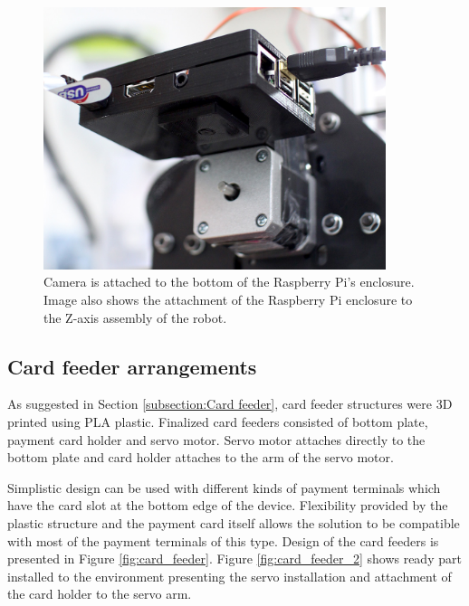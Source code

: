 \begin{figure}[ht]
  \begin{center}
    \includegraphics[width=10cm]{images/camera.jpg}
    \caption{Camera is attached to the bottom of the Raspberry Pi's enclosure. Image also shows the attachment of the Raspberry Pi enclosure to the Z-axis assembly of the robot.}
    \label{fig:camera}
  \end{center}
\end{figure}
\FloatBarrier


\subsection{Card feeder arrangements}
\label{subsection:Card feeder arrangements}

As suggested in Section \ref{subsection:Card feeder}, card feeder structures were 3D printed using PLA plastic. Finalized card feeders consisted of bottom plate, payment card holder and servo motor. Servo motor attaches directly to the bottom plate and card holder attaches to the arm of the servo motor.

Simplistic design can be used with different kinds of payment terminals which have the card slot at the bottom edge of the device. Flexibility provided by the plastic structure and the payment card itself allows the solution to be compatible with most of the payment terminals of this type. Design of the card feeders is presented in Figure \ref{fig:card_feeder}. Figure \ref{fig:card_feeder_2} shows ready part installed to the environment presenting the servo installation and attachment of the card holder to the servo arm.

